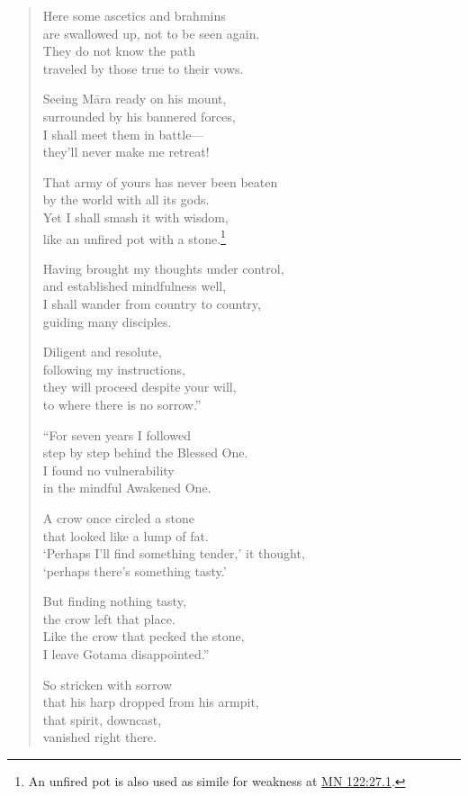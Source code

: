 \documentclass[12pt,openany]{book}%
\begin{document}
\begin{verse}
Here some ascetics and brahmins \\
are swallowed up, not to be seen again. \\
They do not know the path \\
traveled by those true to their vows. 

Seeing \textsanskrit{Māra} ready on his mount, \\
surrounded by his bannered forces, \\
I shall meet them in battle—\\
they’ll never make me retreat! 

That army of yours has never been beaten \\
by the world with all its gods. \\
Yet I shall smash it with wisdom, \\
like an unfired pot with a stone.\footnote{An unfired pot is also used as simile for weakness at \href{https://suttacentral.net/mn122/en/sujato\#27.1}{MN 122:27.1}. } 

Having brought my thoughts under control, \\
and established mindfulness well, \\
I shall wander from country to country, \\
guiding many disciples. 

Diligent and resolute, \\
following my instructions, \\
they will proceed despite your will, \\
to where there is no sorrow.” 

“For seven years I followed \\
step by step behind the Blessed One. \\
I found no vulnerability \\
in the mindful Awakened One. 

A crow once circled a stone \\
that looked like a lump of fat. \\
‘Perhaps I’ll find something tender,’ it thought, \\
‘perhaps there’s something tasty.’ 

But finding nothing tasty, \\
the crow left that place. \\
Like the crow that pecked the stone, \\
I leave Gotama disappointed.” 

So stricken with sorrow \\
that his harp dropped from his armpit, \\
that spirit, downcast, \\
vanished right there. 

%
\end{verse}
\end{document}
